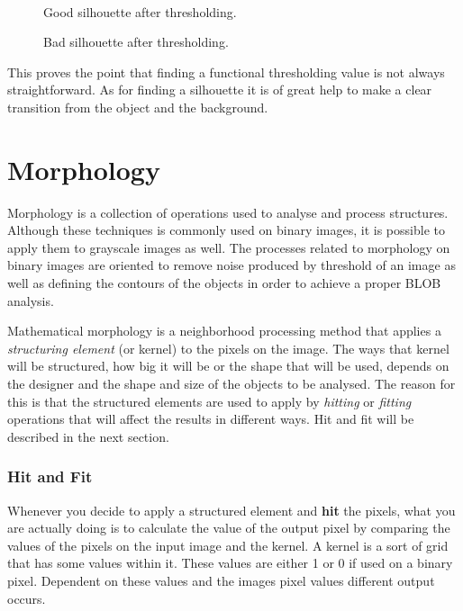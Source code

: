 \begin{figure}[htbp]
\begin{minipage}[b]{0.45\textwidth}
\end{minipage} \\ %
\begin{minipage}[t]{0.45\textwidth}
\caption{Good silhouette after thresholding.} %
\label{fig:SimpleThresholdAfter}
\end{minipage} \hfill
\begin{minipage}[t]{0.45\textwidth}
\caption{Bad silhouette after thresholding.} %
\label{fig:ComplicatedThresholdAfter}
\end{minipage}
\end{figure}
 
This proves the point that finding a functional thresholding value is not always straightforward. As for finding a silhouette it is of great help to make a clear transition from the object and the background.

\section{Morphology}
Morphology is a collection of operations used to analyse and process structures. Although these techniques is commonly used on binary images, it is possible to apply them to grayscale images as well.
The processes related to morphology on binary images are oriented to remove noise produced by threshold of an image as well as defining the contours of the objects in order to achieve a proper BLOB analysis.

Mathematical morphology is a neighborhood processing method that applies a \textit{structuring element} (or kernel) to the pixels on the image. The ways that kernel will be structured, how big it will be or the shape that will be used, depends on the designer and the shape and size of the objects to be analysed. The reason for this is that the structured elements are used to apply by \textit{hitting} or \textit{fitting} operations that will affect the results in different ways. Hit and fit will be described in the next section.

\subsubsection{Hit and Fit}
Whenever you decide to apply a structured element and \textbf{hit} the pixels, what you are actually doing is to calculate the value of the output pixel by comparing the values of the pixels on the input image and the kernel. A kernel is a sort of grid that has some values within it. These values are either 1 or 0 if used on a binary pixel. Dependent on these values and the images pixel values different output occurs.

